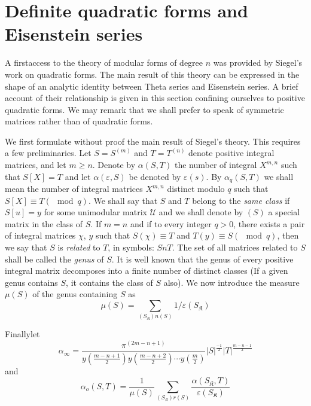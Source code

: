 \chapter{Definite quadratic forms and Eisenstein series}%

A first\pageoriginale access to the theory of modular forms of degree
$n$ was provided by Siegel's work on quadratic forms. The main result
of this theory can be expressed in the shape of an analytic identity
between Theta series and Eisenstein series. A brief account of their 
relationship is given in this section confining ourselves to positive
quadratic forms. We may remark that we shall prefer to speak of
symmetric matrices rather than of quadratic forms. 

We first formulate without proof the main result of Siegel's
theory. This requires a few preliminaries. Let $S = S^{(m)}$ and $T =
T^{(n)}$ denote positive integral matrices, and let $m \ge n$. Denote
by $\alpha (S, T)$ the number of integral $X^{m, n}$ such that
$S[X]= T$ and let $\alpha (\varepsilon, S)$ be denoted by
$\varepsilon (s)$. By $\alpha_q (S, T)$ we shall mean the number of
integral matrices $X^{m ,n }$ distinct modulo $q$ such that
$S[X] \equiv T (\mod q)$. We shall say that $S$ and $T$ belong to
the \textit{same class} if $S [u] = y$ for some unimodular matrix
$\mathcal{U}$ and we shall denote by $(S)$ a special matrix in the
class of $S$. If $m=n$ and if to every integer $q > 0$, there exists a
pair of integral matrices $\chi$, $y$ such that $S (\chi) \equiv T$
and $T(y) \equiv S (\mod q)$, then we say that $S$ is
\textit{related} to $T$, in symbols: $S n T$. The set of all matrices
related to $S$ shall be called the \textit{genus} of $S$. It is well
known that the genus of every positive integral matrix decomposes into
a finite number of distinct classes (If a given genus contains $S$, it
contains the class of $S$ also). We now introduce the measure $\mu
(S)$ of the genus containing $S$ as 
\begin{equation*}
\mu (S) = \sum_{(S_\mathfrak{K})n(S)}1/\varepsilon (S_\mathfrak{K})
\tag{224}\label{eq224}
\end{equation*}

Finally\pageoriginale let 
\begin{equation*}
\alpha_\infty = \frac{\pi^{(2 m - n + 1)}}{y(\frac{m-n+1}{2})
  y (\frac{m-n+2}{2}) \cdots y(\frac{m}{2})}
|S|^{\frac{-1}{2}}|T|^{\frac{m-n-1}{2}} \tag{225}\label{eq225} 
\end{equation*}
and 
\begin{equation*}
\alpha_o (S, T) = \frac{1}{\mu (S)} \sum_{(S_\mathfrak{K}) r (S)} \frac{\alpha
  (S_\mathfrak{K}, T)}{\varepsilon(S_\mathfrak{K})}\tag{226}\label{eq226} 
\end{equation*}


